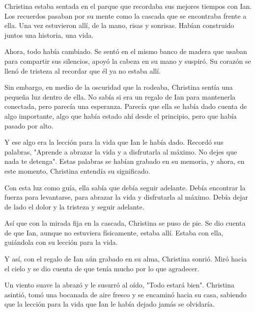 

Christina estaba sentada en el parque que recordaba sus mejores tiempos con Ian. Los recuerdos pasaban por su mente como la cascada que se encontraba frente a ella. Una vez estuvieron allí, de la mano, risas y sonrisas. Habían construido juntos una historia, una vida.

Ahora, todo había cambiado. Se sentó en el mismo banco de madera que usaban para compartir sus silencios, apoyó la cabeza en su mano y suspiró. Su corazón se llenó de tristeza al recordar que él ya no estaba allí.

Sin embargo, en medio de la oscuridad que la rodeaba, Christina sentía una pequeña luz dentro de ella. No sabía si era un regalo de Ian para mantenerla conectada, pero parecía una esperanza. Parecía que ella se había dado cuenta de algo importante, algo que había estado ahí desde el principio, pero que había pasado por alto.

Y ese algo era la lección para la vida que Ian le había dado. Recordó sus palabras, "Aprende a abrazar la vida y a disfrutarla al máximo. No dejes que nada te detenga". Estas palabras se habían grabado en su memoria, y ahora, en este momento, Christina entendía su significado.

Con esta luz como guía, ella sabía que debía seguir adelante. Debía encontrar la fuerza para levantarse, para abrazar la vida y disfrutarla al máximo. Debía dejar de lado el dolor y la tristeza y seguir adelante.

Así que con la mirada fija en la cascada, Christina se puso de pie. Se dio cuenta de que Ian, aunque no estuviera físicamente, estaba allí. Estaba con ella, guiándola con su lección para la vida.

Y así, con el regalo de Ian aún grabado en su alma, Christina sonrió. Miró hacia el cielo y se dio cuenta de que tenía mucho por lo que agradecer.

Un viento suave la abrazó y le susurró al oído, "Todo estará bien". Christina asintió, tomó una bocanada de aire fresco y se encaminó hacia su casa, sabiendo que la lección para la vida que Ian le había dejado jamás se olvidaría.